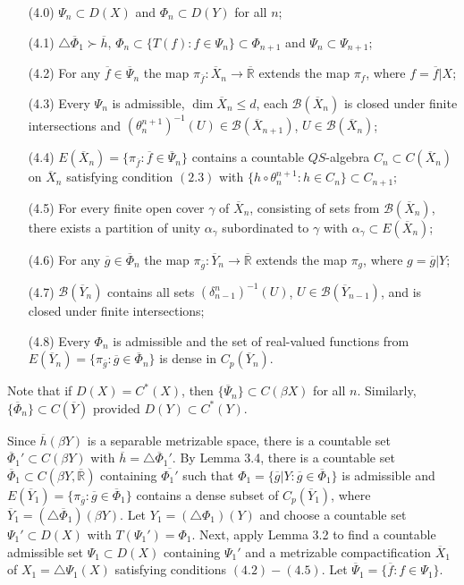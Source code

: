 \documentclass[12pt]{amsart}
\begin{document}
\begin{itemize}
\item[(4.0)] $\Psi_n\subset D(X)$ and $\Phi_n\subset D(Y)$ for all $n$;
\item[(4.1)] $\triangle\overline\Phi_1\succ\overline h$, $\Phi_n\subset\{T(f):f\in\Psi_{n}\}\subset\Phi_{n+1}$ and $\Psi_n\subset\Psi_{n+1}$;
\item[(4.2)] For any $\overline f\in\overline\Psi_n$ the map $\pi_{\overline f}:\overline X_n\to\overline{\mathbb R}$ extends the map $\pi_f$, where $f=\overline f|X$;
\item[(4.3)] Every $\Psi_n$ is admissible, $\dim\overline X_n\leq d$, each $\mathcal B(\overline X_n)$ is closed under finite intersections and $(\theta_n^{n+1})^{-1}(U)\in\mathcal B(\overline X_{n+1})$, $U\in\mathcal B(\overline X_n)$;
\item[(4.4)] $E(\overline X_n)=\{\pi_{\overline f}:\overline f\in\overline\Psi_n\}$ contains a countable $QS$-algebra $C_n\subset C(\overline X_n)$ on $\overline X_n$ satisfying condition $(2.3)$ with $\{h\circ\theta^{n+1}_n:h\in C_{n}\}\subset C_{n+1}$;
\item[(4.5)] For every finite open cover $\gamma$ of $\overline X_n$, consisting of sets from $\mathcal B(\overline X_n)$, there exists a partition of unity $\alpha_\gamma$ subordinated to $\gamma$ with $\alpha_\gamma\subset E(\overline X_n)$;
\item[(4.6)] For any $\overline g\in\overline\Phi_n$ the map $\pi_{\overline g}:\overline Y_n\to\overline{\mathbb R}$ extends the map $\pi_g$, where $g=\overline g|Y$;
\item[(4.7)]  $\mathcal B(\overline Y_n)$ contains all sets $(\delta^{n}_{n-1})^{-1}(U)$, $U\in\mathcal B(\overline Y_{n-1})$, and is closed under finite intersections;
\item[(4.8)] Every $\Phi_n$ is admissible and the set of real-valued functions from $E(\overline Y_n)=\{\pi_{\overline g}: \overline g\in\overline\Phi_n\}$ is dense in $C_p(\overline Y_n)$.
\end{itemize}
Note that if $D(X)=C^*(X)$, then $\{\overline\Psi_n\}\subset C(\beta X)$ for all $n$. Similarly, $\{\overline\Phi_n\}\subset C(\overline Y)$ provided $D(Y)\subset C^*(Y)$. 

Since $\overline h(\beta Y)$ is a separable metrizable space, there is a countable set $\overline \Phi_1'\subset C(\beta Y)$ with $\overline h=\triangle\overline\Phi_1'$. 
By Lemma 3.4, there is a countable set $\overline\Phi_1\subset C(\beta Y,\overline{\mathbb R})$ containing $\overline{\Phi_1'}$ such that $\Phi_1=\{\overline g|Y:\overline g\in\overline\Phi_1\}$ is admissible and
$E(\overline Y_1)=\{\pi_{\overline g}:\overline g\in\overline\Phi_1\}$ contains a dense subset of $C_p(\overline Y_1)$, where 
$\overline Y_1=(\triangle\overline\Phi_1)(\beta Y)$. Let $Y_1=(\triangle\Phi_1)(Y)$ and  
 choose a countable set $\Psi_1'\subset D(X)$ with $T(\Psi_1')=\Phi_1$. Next, apply Lemma 3.2 to find  a countable admissible set $\Psi_1\subset D(X)$ containing 
$\Psi_1'$ and a metrizable compactification $\overline X_1$ of $X_1=\triangle\Psi_1(X)$ satisfying conditions $(4.2)-(4.5)$. Let $\overline\Psi_1=\{\overline f:f\in\Psi_1\}$.
\end{document}
